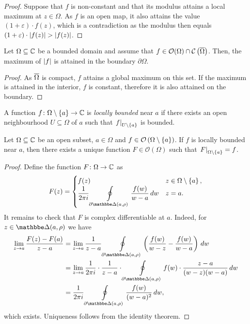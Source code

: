 \begin{proof}
Suppose that $f$ is non-constant and that its modulus attains a
local maximum at $z \in \Omega$. As $f$ is an open map, it also
attains the value $(1 + \varepsilon) \cdot f(z)$, which is a
contradiction as the modulus then equals
$(1 + \varepsilon) \cdot \left\lvert f(z)\right\rvert > \left\lvert f(z)\right\rvert$.
\end{proof}

\begin{izrek}
Let $\Omega \subseteq \mathbb{C}$ be a bounded domain and assume that
$f \in \mathcal{O}(\Omega) \cap \mathcal{C} \left(\overline{\Omega}\right)$.
Then, the maximum of $\left\lvert f\right\rvert$ is attained in the boundary
$\partial \Omega$.
\end{izrek}

\begin{proof}
As $\overline{\Omega}$ is compact, $f$ attains a global maximum on
this set. If the maximum is attained in the interior, $f$ is
constant, therefore it is also attained on the boundary.
\end{proof}


\begin{definicija}
A function $f \colon \Omega \setminus \left\{a\right\} \to \mathbb{C}$ is
\emph{locally bounded} near $a$ if there
exists an open neighbourhood $U \subseteq \Omega$ of $a$ such that
$\left. f\right|_{U \setminus \left\{a\right\}}^{}$ is bounded.
\end{definicija}

\begin{izrek}
Let $\Omega \subseteq \mathbb{C}$ be an open subset, $a \in \Omega$ and
$f \in \mathcal{O} \left(\Omega \setminus \left\{a\right\}\right)$. If $f$ is
locally bounded near $a$, then there exists a unique function
$F \in \mathcal{O}(\Omega)$ such that
$\left. F\right|_{\Omega \setminus \left\{a\right\}}^{} = f$.
\end{izrek}

\begin{proof}
Define the function $F \colon \Omega \to \mathbb{C}$ as
\[
F(z) = \begin{cases}
f(z) & z \in \Omega \setminus \set{a}, \\
\displaystyle
\frac{1}{2 \pi i} \olint_{\partial \dsk(a, \rho)}
\frac{f(w)}{w-a}\,dw & z = a.
\end{cases}
\]
It remains to check that $F$ is complex differentiable at $a$.
Indeed, for $z \in \dsk(a, \rho)$ we have
\begin{align*}
\lim_{z \to a} \frac{F(z) - F(a)}{z-a} &=
\lim_{z \to a} \frac{1}{z-a} \olint_{\partial \dsk(a, \rho)}
\br{\frac{f(w)}{w-z} - \frac{f(w)}{w-a}}\,dw
\\
&=
\lim_{z \to a} \frac{1}{2 \pi i} \cdot \frac{1}{z-a} \cdot
\olint_{\partial \dsk(a, \rho)}
f(w) \cdot \frac{z-a}{(w-z)(w-a)}\,dw
\\
&=
\frac{1}{2 \pi i}
\olint_{\partial \dsk(a, \rho)} \frac{f(w)}{(w-a)^2}\,dw,
\end{align*}
which exists. Uniqueness follows from the identity theorem.
\end{proof}

